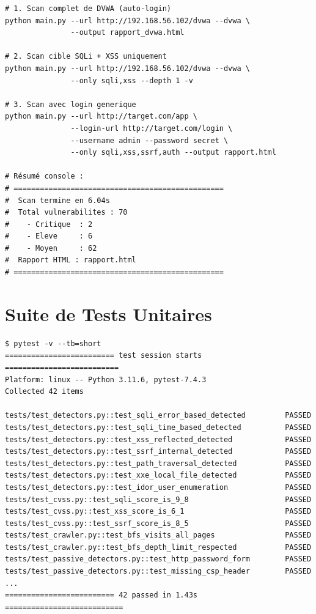 \documentclass[12pt,a4paper]{report}
\begin{document}
\begin{lstlisting}[style=bash, caption={Exemples d'utilisation du scanner}]
# 1. Scan complet de DVWA (auto-login)
python main.py --url http://192.168.56.102/dvwa --dvwa \
               --output rapport_dvwa.html

# 2. Scan cible SQLi + XSS uniquement
python main.py --url http://192.168.56.102/dvwa --dvwa \
               --only sqli,xss --depth 1 -v

# 3. Scan avec login generique
python main.py --url http://target.com/app \
               --login-url http://target.com/login \
               --username admin --password secret \
               --only sqli,xss,ssrf,auth --output rapport.html

# Résumé console :
# ================================================
#  Scan termine en 6.04s
#  Total vulnerabilites : 70
#    - Critique  : 2
#    - Eleve     : 6
#    - Moyen     : 62
#  Rapport HTML : rapport.html
# ================================================
\end{lstlisting}

\section{Suite de Tests Unitaires}

\begin{lstlisting}[style=bash, caption={Résultats complets de la suite pytest (42 tests)}]
$ pytest -v --tb=short
========================= test session starts ==========================
Platform: linux -- Python 3.11.6, pytest-7.4.3
Collected 42 items

tests/test_detectors.py::test_sqli_error_based_detected         PASSED
tests/test_detectors.py::test_sqli_time_based_detected          PASSED
tests/test_detectors.py::test_xss_reflected_detected            PASSED
tests/test_detectors.py::test_ssrf_internal_detected            PASSED
tests/test_detectors.py::test_path_traversal_detected           PASSED
tests/test_detectors.py::test_xxe_local_file_detected           PASSED
tests/test_detectors.py::test_idor_user_enumeration             PASSED
tests/test_cvss.py::test_sqli_score_is_9_8                      PASSED
tests/test_cvss.py::test_xss_score_is_6_1                       PASSED
tests/test_cvss.py::test_ssrf_score_is_8_5                      PASSED
tests/test_crawler.py::test_bfs_visits_all_pages                PASSED
tests/test_crawler.py::test_bfs_depth_limit_respected           PASSED
tests/test_passive_detectors.py::test_http_password_form        PASSED
tests/test_passive_detectors.py::test_missing_csp_header        PASSED
...
========================= 42 passed in 1.43s ===========================
\end{lstlisting}
\end{document}
